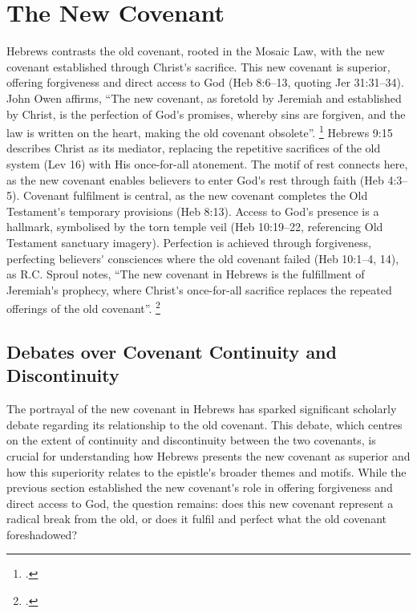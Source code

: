 \documentclass[12pt]{article}
\def\apos{^^27}         %
\def\christ{the Messiah}
\def\christ{Christ}
\begin{document}
\section{The New Covenant}
Hebrews contrasts the old covenant, rooted in the Mosaic Law, with the new
covenant established through \christ{}\apos{}s sacrifice. This new covenant is
superior, offering forgiveness and direct access to God (Heb 8:6--13, quoting
Jer 31:31--34). John Owen affirms, ``The new covenant, as foretold by Jeremiah
and established by \christ{}, is the perfection of God\apos{}s promises, whereby
sins are forgiven, and the law is written on the heart, making the old covenant
obsolete''. \footcite[4:123]{Owen1854}
%
Hebrews 9:15 describes \christ{} as its mediator,
replacing the repetitive sacrifices of the old system (Lev 16) with His
once-for-all atonement. The motif of rest connects here, as the new covenant
enables believers to enter God\apos{}s rest through faith (Heb 4:3--5). Covenant
fulfilment is central, as the new covenant completes the Old Testament\apos{}s
temporary provisions (Heb 8:13). Access to God\apos{}s presence is a hallmark,
symbolised by the torn temple veil (Heb 10:19--22, referencing Old Testament
sanctuary imagery).
%
Perfection is achieved through forgiveness, perfecting believers\apos{}
consciences where the old covenant failed (Heb 10:1--4, 14), as R.C.  Sproul
notes, ``The new covenant in Hebrews is the fulfillment of Jeremiah\apos{}s
prophecy, where Christ\apos{}s once-for-all sacrifice replaces the repeated
offerings of the old covenant''. \footcite[45]{Sproul1985}

\subsection{Debates over Covenant Continuity and Discontinuity} The portrayal of
the new covenant in Hebrews has sparked significant scholarly debate regarding
its relationship to the old covenant. This debate, which centres on the extent
of continuity and discontinuity between the two covenants, is crucial for
understanding how Hebrews presents the new covenant as superior and how this
superiority relates to the epistle\apos{}s broader themes and motifs.  While the
previous section established the new covenant\apos{}s role in offering
forgiveness and direct access to God, the question remains: does this new
covenant represent a radical break from the old, or does it fulfil and perfect
what the old covenant foreshadowed?
\end{document}
